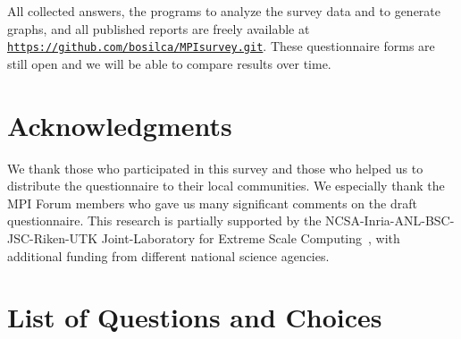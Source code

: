 \documentclass[preprint,5p,times]{elsarticle}
\newcommand{\revision}[2]{{\color{blue}#2}}
\begin{document}
{All collected answers, the programs to analyze the survey data and to
generate graphs, and all published reports are freely available at
{\tt \url{https://github.com/bosilca/MPIsurvey.git}}.
\revision{}{These
questionnaire forms are still open and we will be able to compare
results over time.}

\section*{Acknowledgments}

We thank those who participated in this survey and those who helped us to
distribute the questionnaire to their local communities. We especially thank
the MPI Forum members who gave us many significant comments on the draft
questionnaire. This research is partially supported by the
NCSA-Inria-ANL-BSC-JSC-Riken-UTK Joint-Laboratory for Extreme Scale
Computing~\cite{JLESC}, with additional funding from different national science
agencies.




\appendix
\section{List of Questions and Choices}
\label{app:questions}

}
\end{document}
